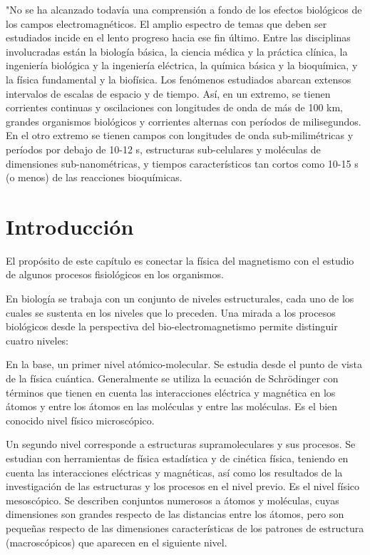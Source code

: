 "No se ha alcanzado todavía una comprensión a fondo de los efectos biológicos de los campos electromagnéticos. El amplio espectro de temas que deben ser estudiados incide en el lento progreso hacia ese fin último. Entre las disciplinas involucradas están la biología básica, la ciencia médica y la práctica clínica, la ingeniería biológica y la ingeniería eléctrica, la química básica y la bioquímica, y la física fundamental y la biofísica. Los fenómenos estudiados abarcan extensos intervalos de escalas de espacio y de tiempo. Así, en un extremo, se tienen corrientes continuas y oscilaciones con longitudes de onda de más de 100 km, grandes organismos biológicos y corrientes alternas con períodos de milisegundos. En el otro extremo se tienen campos con longitudes de onda sub-milimétricas y períodos por debajo de 10-12 s, estructuras sub-celulares y moléculas de dimensiones sub-nanométricas, y tiempos característicos tan cortos como 10-15 s (o menos) de las reacciones bioquímicas\citep{Greenbaum}.

\section{Introducción}

El propósito de este capítulo es conectar la física del magnetismo con el estudio de algunos procesos fisiológicos en los organismos.

En biología se trabaja con un conjunto de niveles estructurales, cada uno de los cuales se sustenta en los niveles que lo preceden. Una mirada a los procesos biológicos desde la perspectiva del bio-electromagnetismo permite distinguir cuatro niveles:

En la base, un primer nivel atómico-molecular. Se estudia desde el punto de vista de la física cuántica. Generalmente se utiliza la ecuación de Schrödinger con términos que tienen en cuenta las interacciones eléctrica y magnética en los átomos y entre los átomos en las moléculas y entre las moléculas. Es el bien conocido nivel físico microscópico.

Un segundo nivel corresponde a estructuras supramoleculares y sus procesos.
Se estudian con herramientas de física estadística y de cinética física, teniendo en cuenta las interacciones eléctricas y magnéticas, así como los resultados de la investigación de las estructuras y los procesos en el nivel previo. Es el nivel físico mesoscópico. Se describen conjuntos numerosos a átomos y moléculas, cuyas dimensiones son grandes respecto de las distancias entre los átomos, pero son pequeñas respecto de las dimensiones características de los patrones de estructura (macroscópicos) que aparecen en el siguiente nivel.

